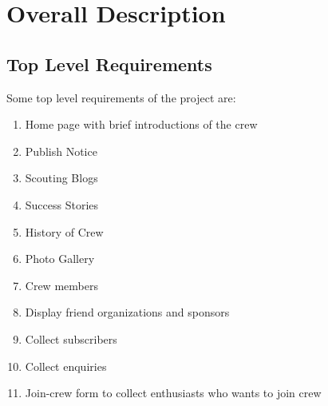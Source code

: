 \chapter{Overall Description}
	\section{Top Level Requirements}
		Some top level requirements of the project are:
		\begin{enumerate}
			\item Home page with brief introductions of the crew
			\item Publish Notice
			\item Scouting Blogs
			\item Success Stories
			\item History of Crew
			\item Photo Gallery 
			\item Crew members
			\item Display friend organizations and sponsors
			\item Collect subscribers
			\item Collect enquiries
			\item Join-crew form to collect enthusiasts who wants to join crew 
		\end{enumerate}
